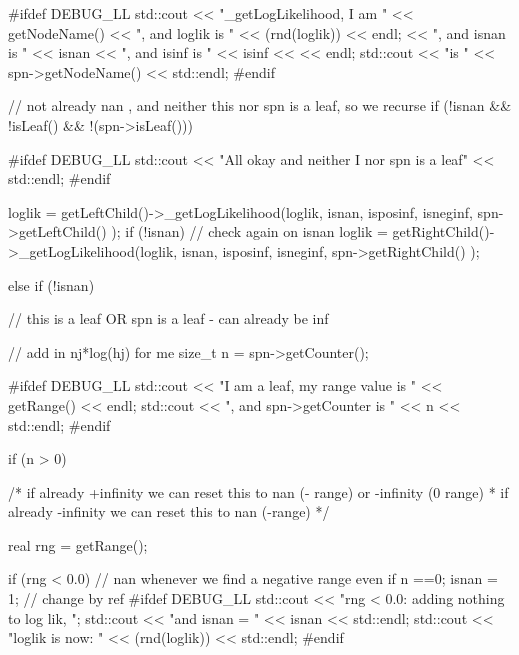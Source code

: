 \begin{DoxyCode}
{
  #ifdef DEBUG_LL
    std::cout << "\nIn _getLogLikelihood, I am " << getNodeName() 
    << ", and loglik is " << (rnd(loglik)) << endl;
    << ", and isnan is " << isnan << ", and isinf is " << isinf <<  << endl;
    std::cout << "\nspn is " << spn->getNodeName() << std::endl;
  #endif
  
  // not already nan , and neither this nor spn is a leaf, so we recurse
  if (!isnan && !isLeaf() && !(spn->isLeaf())) {
    
    #ifdef DEBUG_LL
      std::cout << "All okay and neither I nor spn is a leaf" << std::endl;
    #endif
    
    loglik = getLeftChild()->_getLogLikelihood(loglik, 
                isnan, isposinf, isneginf,
                spn->getLeftChild() );
    if (!isnan) { // check again on isnan
      loglik = getRightChild()->_getLogLikelihood(loglik, 
                isnan, isposinf, isneginf,
                spn->getRightChild() );
    }
  }
  else if (!isnan) { // this is a leaf OR spn is a leaf - can already be inf
  
    // add in nj*log(hj) for me
    size_t n = spn->getCounter();
    
    #ifdef DEBUG_LL
      std::cout << "I am a leaf, my range value is " << getRange() << endl;
      std::cout << ", and spn->getCounter is " << n << std::endl;
    #endif
      
    if (n > 0) {
      
      /* if already +infinity we can reset this to nan (- range) or -infinity
       (0 range)
      * if already -infinity we can reset this to nan (-range) */
    
      real rng = getRange();
      
      if (rng < 0.0) { // nan whenever we find a negative range even if n ==0;
        isnan = 1; // change by ref
        #ifdef DEBUG_LL
          std::cout << "rng < 0.0: adding nothing to log lik, ";
          std::cout << "and isnan = " << isnan << std::endl;
          std::cout << "loglik is now: " << (rnd(loglik)) << std::endl;
        #endif
      }
      
}}}
\end{DoxyCode}
